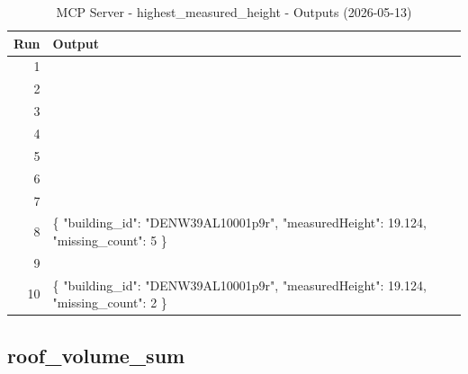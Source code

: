 \documentclass[a4paper,11pt]{article}
\begin{document}
\begin{table}[ht]
\centering
\scriptsize
\caption{MCP Server - highest\_measured\_height - Outputs (2026-05-13)}
\label{tab:mcp\_highest\_measured\_height\_outputs\_2026-05-13}
\begin{tabular}{r p{12cm}}
\hline
Run & Output \\
\hline
1 &  \\
2 &  \\
3 &  \\
4 &  \\
5 &  \\
6 &  \\
7 &  \\
8 & \{
  "building\_id": "DENW39AL10001p9r",
  "measuredHeight": 19.124,
  "missing\_count": 5
\} \\
9 &  \\
10 & \{
  "building\_id": "DENW39AL10001p9r",
  "measuredHeight": 19.124,
  "missing\_count": 2
\} \\
\hline
\end{tabular}
\end{table}

\clearpage
\subsection{roof\_volume\_sum}
\end{document}
